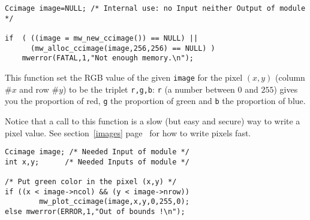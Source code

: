 \Next
\Example
\begin{verbatim}
Ccimage image=NULL; /* Internal use: no Input neither Output of module */

if  ( ((image = mw_new_ccimage()) == NULL) ||
      (mw_alloc_ccimage(image,256,256) == NULL) )
    mwerror(FATAL,1,"Not enough memory.\n");
\end{verbatim}


\newpage %
\Description
This function set the RGB value of the given \verb+image+ for the pixel $(x,y)$ (column $\# x$ and row $\# y$) to be the triplet \verb+r,g,b+:
\verb+r+ (a number between $0$ and $255$) gives you the proportion of red, \verb+g+ the proportion of green and \verb+b+ the proportion of blue.

Notice that a call to this function is a slow (but easy and secure) way to 
write a pixel value.
See section~\ref{images} page~\pageref{images} for how to write pixels fast.

\Next
\Example
\begin{verbatim}
Ccimage image; /* Needed Input of module */
int x,y;      /* Needed Inputs of module */

/* Put green color in the pixel (x,y) */
if ((x < image->ncol) && (y < image->nrow))
        mw_plot_ccimage(image,x,y,0,255,0);
else mwerror(ERROR,1,"Out of bounds !\n");

\end{verbatim}

\newpage %
